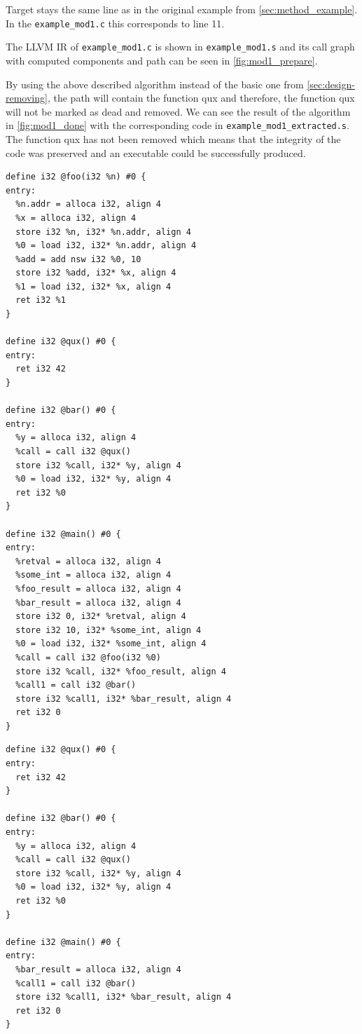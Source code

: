 \documentclass[12pt, twoside]{fithesis2}
\renewcommand{\_}{\leavevmode \kern0.07em\vbox{\hrule width0.4em}}
\begin{document}
Target stays the same line as in the original example from
\autoref{sec:method_example}.
In the \texttt{example_mod1.c} this corresponds to line 11.

The LLVM IR of \texttt{example_mod1.c} is shown in
\texttt{example_mod1.s} and its call graph with computed components
and path can be seen in \autoref{fig:mod1_prepare}.

By using the above described algorithm instead of the basic one from
\autoref{sec:design-removing}, the path will contain the function qux and
therefore, the function qux will not be marked as dead and removed.
We can see the result of the algorithm in \autoref{fig:mod1_done} with the
corresponding code in \texttt{example_mod1_extracted.s}.
The function qux has not been removed which means that the integrity of the code
was preserved and an executable could be successfully produced.

\begin{verbatim}
define i32 @foo(i32 %n) #0 {
entry:
  %n.addr = alloca i32, align 4
  %x = alloca i32, align 4
  store i32 %n, i32* %n.addr, align 4
  %0 = load i32, i32* %n.addr, align 4
  %add = add nsw i32 %0, 10
  store i32 %add, i32* %x, align 4
  %1 = load i32, i32* %x, align 4
  ret i32 %1
}

define i32 @qux() #0 {
entry:
  ret i32 42
}

define i32 @bar() #0 {
entry:
  %y = alloca i32, align 4
  %call = call i32 @qux()
  store i32 %call, i32* %y, align 4
  %0 = load i32, i32* %y, align 4
  ret i32 %0
}

define i32 @main() #0 {
entry:
  %retval = alloca i32, align 4
  %some_int = alloca i32, align 4
  %foo_result = alloca i32, align 4
  %bar_result = alloca i32, align 4
  store i32 0, i32* %retval, align 4
  store i32 10, i32* %some_int, align 4
  %0 = load i32, i32* %some_int, align 4
  %call = call i32 @foo(i32 %0)
  store i32 %call, i32* %foo_result, align 4
  %call1 = call i32 @bar()
  store i32 %call1, i32* %bar_result, align 4
  ret i32 0
}
\end{verbatim}

\begin{verbatim}
define i32 @qux() #0 {
entry:
  ret i32 42
}

define i32 @bar() #0 {
entry:
  %y = alloca i32, align 4
  %call = call i32 @qux()
  store i32 %call, i32* %y, align 4
  %0 = load i32, i32* %y, align 4
  ret i32 %0
}

define i32 @main() #0 {
entry:
  %bar_result = alloca i32, align 4
  %call1 = call i32 @bar()
  store i32 %call1, i32* %bar_result, align 4
  ret i32 0
}
\end{verbatim}
\end{document}
